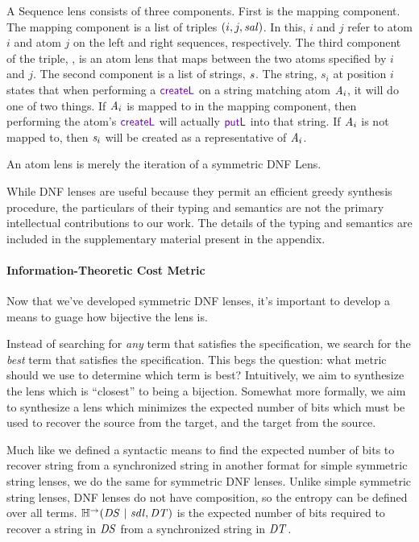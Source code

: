 \documentclass[acmsmall,screen,anonymous]{acmart}
\begin{document}
A Sequence lens \SSQLens{} consists of three components. First is the mapping
component. The mapping component is a list of triples $(i,j,\mathit{sal})$. In
this, $i$ and $j$ refer to atom $i$ and atom $j$ on the left and right
sequences, respectively. The third component of the triple, \SAtomLens{}, is an atom lens that
maps between the two atoms specified by $i$ and $j$. The second component is a
list of strings, $\mathit{s}$. The string, $s_i$ at position $i$ states that when
performing a $\CreateL$ on a string matching atom $\mathit{A}_i$, it will do one of
two things. If $\mathit{A}_i$ is mapped to in the mapping component, then performing
the atom's $\CreateL$ will actually $\PutL$ into that string. If $\mathit{A}_i$ is
not mapped to, then $\mathit{s}_i$ will be created as a representative of
$\mathit{A}_i$.

An atom lens \AtomLens{} is merely the iteration of a symmetric DNF Lens.

While DNF lenses are useful because they permit an efficient greedy synthesis
procedure, the particulars of their typing and semantics are not the primary
intellectual contributions to our work. The details of the typing and semantics
are included in the supplementary material present in the appendix.

\paragraph*{Information-Theoretic Cost Metric}
Now that we've developed symmetric DNF lenses, it's important to develop a means
to guage how bijective the lens is.

Instead of searching for \emph{any} term that satisfies the specification, we
search for the \emph{best} term that satisfies the specification. This begs the
question: what metric should we use to determine which term is best?
Intuitively, we aim to synthesize the lens which is ``closest'' to being a
bijection. Somewhat more formally, we aim to synthesize a lens which minimizes
the expected number of bits which must be used to recover the source from the
target, and the target from the source.

Much like we defined a syntactic means to find the expected number of bits to
recover string from a synchronized string in another format for simple symmetric
string lenses, we do the same for symmetric DNF lenses.  Unlike simple symmetric
string lenses, DNF lenses do not have composition, so the entropy can be defined
over all terms.  $\mathbb{H}^\rightarrow(\mathit{DS} ~|~ \mathit{sdl}, \mathit{DT})$ is the
expected number of bits required to recover a string in $\mathit{DS}$ from a
synchronized string in $\mathit{DT}$.
\end{document}
